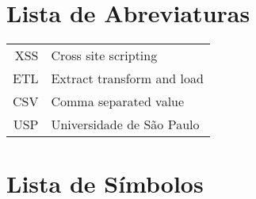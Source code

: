     \newcommand\disablenewpage[1]{{\let\clearpage\par\let\cleardoublepage\par #1}}
    
    \bgroup
    \raggedbottom
    
    
    \disablenewpage{\chapter*{Lista de Abreviaturas}}
    
    \begin{tabular}{rl}
       XSS & Cross site scripting\\
       ETL & Extract transform and load \\
       CSV & Comma separated value \\
       USP & Universidade de São Paulo
    \end{tabular}
    
    \disablenewpage{\chapter*{Lista de Símbolos}}
    
